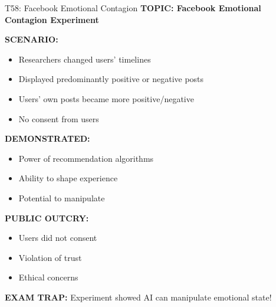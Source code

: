 \documentclass[8pt]{beamer}
\begin{document}
	\begin{frame}{T58: Facebook Emotional Contagion}
		\fontsize{6.5}{7.5}\selectfont
		\textbf{TOPIC: Facebook Emotional Contagion Experiment}
		
		\vspace{0.1cm}
		\textbf{SCENARIO:}
		\begin{itemize}
			\item Researchers changed users' timelines
			\item Displayed predominantly positive or negative posts
			\item Users' own posts became more positive/negative
			\item No consent from users
		\end{itemize}
		
		\vspace{0.1cm}
		\textbf{DEMONSTRATED:}
		\begin{itemize}
			\item Power of recommendation algorithms
			\item Ability to shape experience
			\item Potential to manipulate
		\end{itemize}
		
		\vspace{0.1cm}
		\textbf{PUBLIC OUTCRY:}
		\begin{itemize}
			\item Users did not consent
			\item Violation of trust
			\item Ethical concerns
		\end{itemize}
		
		\textcolor{myred}{\textbf{EXAM TRAP:}} Experiment showed \textcolor{myblue}{AI can manipulate emotional state}!
	\end{frame}
	
\end{document}
